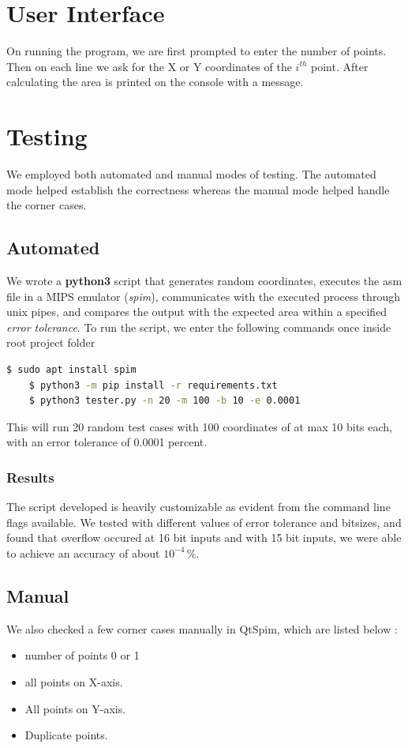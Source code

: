 \documentclass[hidelinks,12pt]{article}
\begin{document}
\section{User Interface}
On running the program, we are first prompted to enter the number of points.
Then on each line we ask for the X or Y coordinates of the \(i^{th}\) point.
After calculating the area is printed on the console with a message.

\section{Testing}
We employed both automated and manual modes of testing. The automated mode helped establish the correctness whereas the manual mode helped handle the corner cases.
\subsection{Automated}
We wrote a \textbf{python3} script that generates random coordinates, executes the asm file in a MIPS emulator (\textit{spim}), communicates with the executed process through unix pipes, and compares the
output with the expected area within a specified \textit{error tolerance}. To run the script, we enter the following commands once inside root project folder
\begin{lstlisting}[language=bash]
    $ sudo apt install spim
    $ python3 -m pip install -r requirements.txt
    $ python3 tester.py -n 20 -m 100 -b 10 -e 0.0001 
\end{lstlisting}

This will run 20 random test cases with 100 coordinates of at max 10 bits each,
with an error tolerance of  0.0001 percent. \\[0.2cm]

\subsubsection{Results}
The script developed is heavily customizable as evident from the command line flags available.
We tested with different values of error tolerance and bitsizes, and found that overflow occured at 16 bit inputs
and with 15 bit inputs, we were able to achieve an accuracy of about \(10^{-4}\,\%\). 
\newpage
\subsection{Manual}
We also checked a few corner cases manually in QtSpim, which are listed below : 
\begin{itemize}
    \item number of points 0 or 1
    \item all points on X-axis.
    \item All points on Y-axis.
    \item Duplicate points.
\end{itemize}
\end{document}
